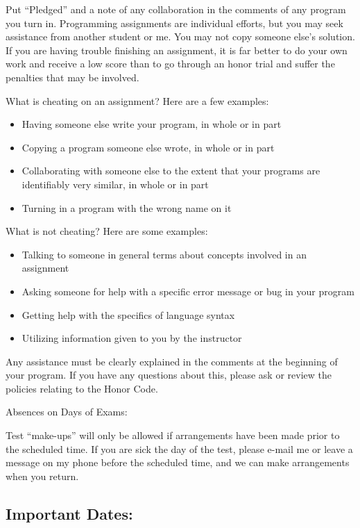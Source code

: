 \documentclass[11pt]{article}
\begin{document}
Put “Pledged” and a note of any collaboration in the comments of
any program you turn in. Programming assignments are individual
efforts, but you may seek assistance from another student or me.
You may not copy someone else’s solution.  If you are having
trouble finishing an assignment, it is far better to do your own
work and receive a low score than to go through an honor trial and
suffer the penalties that may be involved.

What is cheating on an assignment? Here are a few examples:

\begin{itemize}
\item Having someone else write your program, in whole or in part
\item Copying a program someone else wrote, in whole or in part
\item Collaborating with someone else to the extent that your programs
are identifiably very similar, in whole or in part
\item Turning in a program with the wrong name on it
\end{itemize}

What is not cheating?  Here are some examples:

\begin{itemize}
\item Talking to someone in general terms about concepts involved in
an assignment
\item Asking someone for help with a specific error message or bug in
your program
\item Getting help with the specifics of language syntax
\item Utilizing information given to you by the instructor
\end{itemize}

Any assistance must be clearly explained in the comments at the
beginning of your program.  If you have any questions about this,
please ask or review the policies relating to the Honor Code.

Absences on Days of Exams:

Test “make-ups” will only be allowed if arrangements have been
made prior to the scheduled time.  If you are sick the day of the
test, please e-mail me or leave a message on my phone before the
scheduled time, and we can make arrangements when you return.

\subsection{Important Dates:}
\label{sec:org1a412a5}
\end{document}
